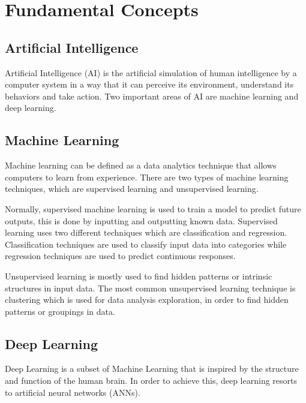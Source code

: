 
\section{Fundamental Concepts}
    \subsection{Artificial Intelligence}
    \par Artificial Intelligence (AI) is the artificial simulation of human intelligence by a computer system in a way that it can perceive its environment, understand its behaviors and take action. Two important areas of AI are machine learning and deep learning. \cite{mathworks_AI}

    \subsection{Machine Learning}



    \par Machine learning can be defined as a data analytics technique that allows computers to learn from experience. There are two types of machine learning techniques, which are supervised learning and unsupervised learning.
    \par Normally, supervised machine learning is used to train a model to predict future outputs, this is done by inputting and outputting known data. Supervised learning uses two different techniques which are classification and regression. Classification techniques are used to classify input data into categories while regression techniques are used to predict continuous responses. 
    \par Unsupervised learning is mostly used to find hidden patterns or intrinsic structures in input data. The most common unsupervised learning technique is clustering which is used for data analysis exploration, in order to find hidden patterns or groupings in data. \cite{mathworks_NN}

    \subsection{Deep Learning}


    \par Deep Learning is a subset of Machine Learning that is inspired by the structure and function of the human brain. In order to achieve this, deep learning resorts to artificial neural networks (ANNs).
    
